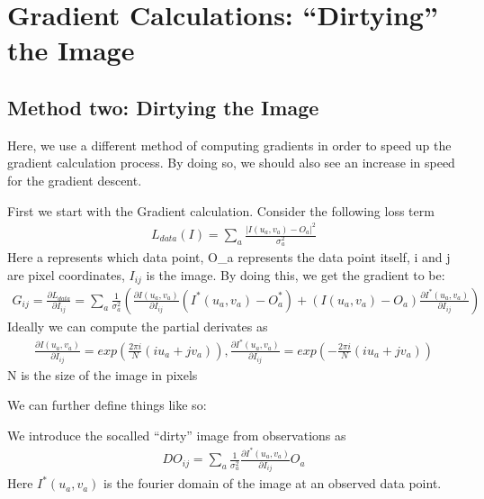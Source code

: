 \documentclass[letterpaper,10pt,english]{jupyterBook}
\begin{document}
\chapter{Gradient Calculations: “Dirtying” the Image}
\label{\detokenize{dirty_gradient:gradient-calculations-dirtying-the-image}}\label{\detokenize{dirty_gradient::doc}}

\section{Method two: Dirtying the Image}
\label{\detokenize{dirty_gradient:method-two-dirtying-the-image}}
\sphinxAtStartPar
Here, we use a different method of computing gradients in order to speed up the gradient calculation process. By doing so, we should also see an increase in speed for the gradient descent.

\sphinxAtStartPar
First we start with the Gradient calculation. Consider the following loss term
\begin{equation*}
\begin{split}L_{data}(I) = \sum_a\frac{|I(u_a,v_a)-O_a|^2}{\sigma_a^2}\end{split}
\end{equation*}
\sphinxAtStartPar
Here a represents which data point, O\_a represents the data point itself, i and j are pixel coordinates, \(I_{ij}\) is the image. By doing this, we get the gradient to be:
\begin{equation*}
\begin{split}G_{ij} = \frac{\partial L_{data}}{\partial I_{ij}} = \sum_a \frac{1}{\sigma_a^2}(\frac{\partial I(u_a,v_a)}{\partial I_{ij}}(I^*(u_a,v_a)-O_a^*) + (I(u_a,v_a)-O_a)\frac{\partial I^*(u_a,v_a)}{\partial I_{ij}})\end{split}
\end{equation*}
\sphinxAtStartPar
Ideally we can compute the partial derivates as
\begin{equation*}
\begin{split}\frac{\partial I(u_a,v_a)}{\partial I_{ij}} = exp(\frac{2\pi i}{N}(iu_a+jv_a)), \frac{\partial I^*(u_a,v_a)}{\partial I_{ij}} = exp(-\frac{2\pi i}{N}(iu_a+jv_a))\end{split}
\end{equation*}
\sphinxAtStartPar
N is the size of the image in pixels

\sphinxAtStartPar
We can further define things like so:

\sphinxAtStartPar
We introduce the so\sphinxhyphen{}called “dirty” image from observations as
\begin{equation*}
\begin{split}DO_{ij} = \sum_a \frac{1}{\sigma^2_a}\frac{\partial I^*(u_a,v_a)}{\partial I_{ij}}O_a\end{split}
\end{equation*}
\sphinxAtStartPar
Here \(I^*(u_a,v_a)\) is the fourier domain of the image at an observed data point.
\end{document}
